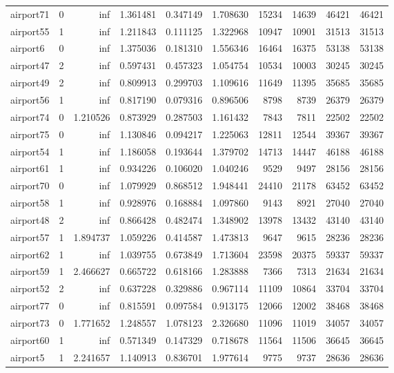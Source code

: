 \begin{longtable}{|l|r|r|r|r|r|r|r|r|r|}
airport71 & 0 & inf & 1.361481 & 0.347149 & 1.708630 & 15234 & 14639 & 46421 & 46421 \\
airport55 & 1 & inf & 1.211843 & 0.111125 & 1.322968 & 10947 & 10901 & 31513 & 31513 \\
airport6 & 0 & inf & 1.375036 & 0.181310 & 1.556346 & 16464 & 16375 & 53138 & 53138 \\
airport47 & 2 & inf & 0.597431 & 0.457323 & 1.054754 & 10534 & 10003 & 30245 & 30245 \\
airport49 & 2 & inf & 0.809913 & 0.299703 & 1.109616 & 11649 & 11395 & 35685 & 35685 \\
airport56 & 1 & inf & 0.817190 & 0.079316 & 0.896506 & 8798 & 8739 & 26379 & 26379 \\
airport74 & 0 & 1.210526 & 0.873929 & 0.287503 & 1.161432 & 7843 & 7811 & 22502 & 22502 \\
airport75 & 0 & inf & 1.130846 & 0.094217 & 1.225063 & 12811 & 12544 & 39367 & 39367 \\
airport54 & 1 & inf & 1.186058 & 0.193644 & 1.379702 & 14713 & 14447 & 46188 & 46188 \\
airport61 & 1 & inf & 0.934226 & 0.106020 & 1.040246 & 9529 & 9497 & 28156 & 28156 \\
airport70 & 0 & inf & 1.079929 & 0.868512 & 1.948441 & 24410 & 21178 & 63452 & 63452 \\
airport58 & 1 & inf & 0.928976 & 0.168884 & 1.097860 & 9143 & 8921 & 27040 & 27040 \\
airport48 & 2 & inf & 0.866428 & 0.482474 & 1.348902 & 13978 & 13432 & 43140 & 43140 \\
airport57 & 1 & 1.894737 & 1.059226 & 0.414587 & 1.473813 & 9647 & 9615 & 28236 & 28236 \\
airport62 & 1 & inf & 1.039755 & 0.673849 & 1.713604 & 23598 & 20375 & 59337 & 59337 \\
airport59 & 1 & 2.466627 & 0.665722 & 0.618166 & 1.283888 & 7366 & 7313 & 21634 & 21634 \\
airport52 & 2 & inf & 0.637228 & 0.329886 & 0.967114 & 11109 & 10864 & 33704 & 33704 \\
airport77 & 0 & inf & 0.815591 & 0.097584 & 0.913175 & 12066 & 12002 & 38468 & 38468 \\
airport73 & 0 & 1.771652 & 1.248557 & 1.078123 & 2.326680 & 11096 & 11019 & 34057 & 34057 \\
airport60 & 1 & inf & 0.571349 & 0.147329 & 0.718678 & 11564 & 11506 & 36645 & 36645 \\
airport5 & 1 & 2.241657 & 1.140913 & 0.836701 & 1.977614 & 9775 & 9737 & 28636 & 28636 \\

\end{longtable}
